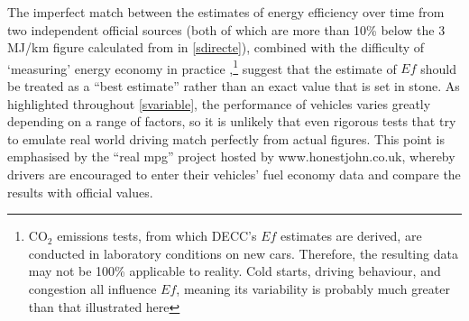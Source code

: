 The imperfect match between the estimates of energy efficiency over
time from two independent official sources (both of which are
more than 10\% below the 3 MJ/km figure calculated from
\citep{Defra2011} in \cref{sdirecte}), combined with the difficulty of `measuring'
energy economy in
practice
\citep{Schipper1993},\footnote{CO$_2$
emissions tests, from which
DECC's $Ef$ estimates are derived, are conducted in laboratory conditions on
new cars. Therefore, the resulting data may not be 100\% applicable to reality.
Cold starts, driving behaviour, and congestion all influence $Ef$, meaning its
variability is probably much greater than that illustrated here
}
suggest that
the \citet{Decc2011t} estimate of $Ef$ should be treated as a ``best estimate''
rather than an exact value that is set in stone. As highlighted throughout
\cref{svariable}, the performance of vehicles varies greatly depending
on a range of factors, so it is unlikely that even rigorous tests that
try to emulate real world driving match perfectly from actual figures.
This point is emphasised by the ``real mpg'' project hosted by
www.honestjohn.co.uk, whereby drivers are encouraged to enter their
vehicles' fuel economy data and compare the results with official values.


